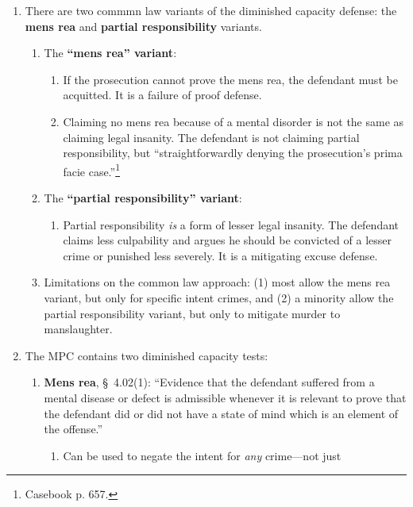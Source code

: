 \begin{enumerate}
    \item There are two commmn law variants of the diminished capacity defense: the 
    \textbf{mens rea} and \textbf{partial responsibility} variants.
    \begin{enumerate}
        \item The \textbf{``mens rea'' variant}:
        \begin{enumerate}
            \item If the prosecution cannot prove the mens rea, the defendant must 
            be acquitted. It is a failure of proof defense.
            \item Claiming no mens rea because of a mental disorder is not the 
            same as claiming legal insanity. The defendant is not claiming partial 
            responsibility, but ``straightforwardly denying the prosecution's 
            prima facie case.''\footnote{Casebook p. 657.}
        \end{enumerate}
        \item The \textbf{``partial responsibility'' variant}:
        \begin{enumerate}
            \item Partial responsibility \emph{is} a form of lesser legal 
            insanity. The defendant claims less culpability and argues he should 
            be convicted of a lesser crime or punished less severely. It is a 
            mitigating excuse defense.
        \end{enumerate}
        \item Limitations on the common law approach: (1) most allow the mens rea 
        variant, but only for specific intent crimes, and (2) a minority allow 
        the partial responsibility variant, but only to mitigate murder to 
        manslaughter.
    \end{enumerate}
    \item The MPC contains two diminished capacity tests:
    \begin{enumerate}
        \item \textbf{Mens rea}, \S\ 4.02(1): ``Evidence that the defendant 
        suffered from a mental disease or defect is admissible whenever it is 
        relevant to prove that the defendant did or did not have a state of 
        mind which is an element of the offense.''
        \begin{enumerate}
            \item Can be used to negate the intent for \emph{any} crime---not just 

\end{enumerate}
\end{enumerate}
\end{enumerate}
